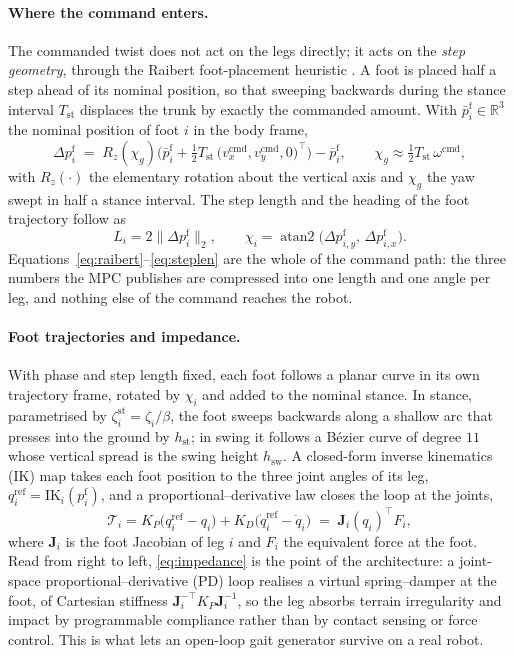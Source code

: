 \documentclass[11pt,a4paper]{article}
\newcommand{\R}{\mathbb{R}}
\newcommand{\Tst}{T_{\mathrm{st}}}
\newcommand{\pf}{p^{\mathrm{f}}}
\begin{document}
\paragraph{Where the command enters.} The commanded twist does not act on the legs directly; it acts on the
\emph{step geometry}, through the Raibert foot-placement heuristic \cite{raibert1986legged}. A foot is placed
half a step ahead of its nominal position, so that sweeping backwards during the stance interval $\Tst$
displaces the trunk by exactly the commanded amount. With $\bar\pf_i\in\R^3$ the nominal position of foot $i$
in the body frame,
\begin{equation}
  \Delta\pf_i \;=\; R_z(\chi_g)\Big(\bar\pf_i+\tfrac{1}{2}\Tst\,
                  \big(v_x^{\mathrm{cmd}},v_y^{\mathrm{cmd}},0\big)^{\!\top}\Big)-\bar\pf_i ,
  \qquad
  \chi_g \approx \tfrac{1}{2}\Tst\,\omega^{\mathrm{cmd}} ,
  \label{eq:raibert}
\end{equation}
with $R_z(\cdot)$ the elementary rotation about the vertical axis and $\chi_g$ the yaw swept in half a stance
interval. The step length and the heading of the foot trajectory follow as
\begin{equation}
  L_i = 2\big\|\Delta\pf_i\big\|_2 ,
  \qquad
  \chi_i=\operatorname{atan2}\big(\Delta\pf_{i,y},\,\Delta\pf_{i,x}\big).
  \label{eq:steplen}
\end{equation}
Equations~\eqref{eq:raibert}--\eqref{eq:steplen} are the whole of the command path: the three numbers the MPC
publishes are compressed into one length and one angle per leg, and nothing else of the command reaches the
robot.

\paragraph{Foot trajectories and impedance.} With phase and step length fixed, each foot follows a planar
curve in its own trajectory frame, rotated by $\chi_i$ and added to the nominal stance. In stance,
parametrised by $\zeta_i^{\mathrm{st}}=\zeta_i/\beta$, the foot sweeps backwards along a shallow arc that
presses into the ground by $h_{\mathrm{st}}$; in swing it follows a B\'ezier curve of degree $11$ whose
vertical spread is the swing height $h_{\mathrm{sw}}$. A closed-form inverse kinematics (IK) map takes each foot
position to the three joint angles of its leg, $q_i^{\mathrm{ref}}=\mathrm{IK}_i(\pf_i)$, and a
proportional--derivative law closes the loop at the joints,
\begin{equation}
  \mathcal{T}_i = K_P\big(q_i^{\mathrm{ref}}-q_i\big)+K_D\big(\dot q_i^{\mathrm{ref}}-\dot q_i\big)
  \;=\;\bm{J}_i(q_i)^{\!\top}F_i ,
  \label{eq:impedance}
\end{equation}
where $\bm{J}_i$ is the foot Jacobian of leg $i$ and $F_i$ the equivalent force at the foot. Read from right
to left, \eqref{eq:impedance} is the point of the architecture: a joint-space proportional--derivative (PD) loop realises a virtual
spring--damper at the foot, of Cartesian stiffness $\bm{J}_i^{-\top}K_P\bm{J}_i^{-1}$, so the leg absorbs
terrain irregularity and impact by programmable compliance rather than by contact sensing or force control.
This is what lets an open-loop gait generator survive on a real robot.
\end{document}
